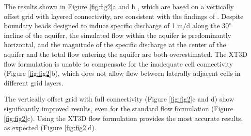 \documentclass{article}
\begin{document}
The results shown in Figure \ref{fig:fig2}a and b , which are based on a vertically offset grid with layered connectivity, are consistent with the findings of \cite{bardot2022}. Despite boundary heads designed to induce specific discharge of 1 m/d along the $30^{\circ}$ incline of the aquifer, the simulated flow within the aquifer is predominantly horizontal, and the magnitude of the specific discharge at the center of the aquifer and the total flow entering the aquifer are both overestimated. The XT3D flow formulation is unable to compensate for the inadequate cell connectivity (Figure \ref{fig:fig2}b), which does not allow flow between laterally adjacent cells in different grid layers.

The vertically offset grid with full connectivity (Figure \ref{fig:fig2}c and d) show significantly improved results, even for the standard flow formulation (Figure \ref{fig:fig2}c). Using the XT3D flow formulation provides the most accurate results, as expected (Figure \ref{fig:fig2}d).
\end{document}

